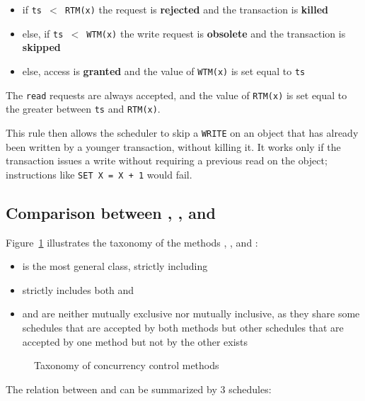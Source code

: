 \documentclass[english]{article}
\begin{document}
\begin{itemize}
  \item[\xmarkthin] if \texttt{ts \(<\) RTM(x)} the request is \textbf{rejected} and the transaction is \textbf{killed}
  \item[\xmarkthin] else, if \texttt{ts \(<\) WTM(x)} the write request is \textbf{obsolete} and the transaction is \textbf{skipped}
  \item[\cmarkthin] else, access is \textbf{granted} and the value of \texttt{WTM(x)} is set equal to \texttt{ts}
\end{itemize}

The \texttt{read} requests are always accepted, and the value of \texttt{RTM(x)} is set equal to the greater between \texttt{ts} and \texttt{RTM(x)}.

This rule then allows the scheduler to skip a \texttt{WRITE} on an object that has already been written by a younger transaction, without killing it.
It works only if the transaction issues a write without requiring a previous read on the object;
instructions like \texttt{SET X = X + 1} would fail.

\subsection{Comparison between \vsr, \csr, \tpl and \ts}

Figure~\ref{fig:concurrency-control-comparison} illustrates the taxonomy of the methods \vsr, \csr, \tpl and \ts:

\begin{itemize}
  \item \vsr is the most general class, strictly including \csr
  \item \csr strictly includes both \tpl and \ts
  \item \tpl and \ts are neither mutually exclusive nor mutually inclusive, as they share some schedules that are accepted by both methods but other schedules that are accepted by one method but not by the other exists
\end{itemize}

\begin{figure}[htbp]
  \centering
  \bigskip
  \caption{Taxonomy of concurrency control methods}
  \label{fig:concurrency-control-comparison}
  \bigskip
\end{figure}

\bigskip
The relation between \ts and \tpl can be summarized by \(3\) schedules:
\end{document}
